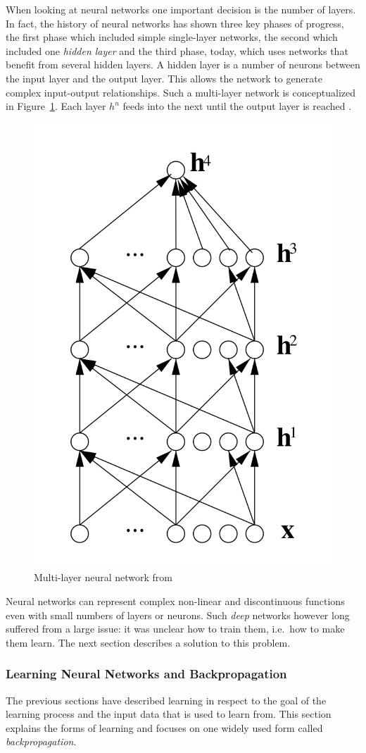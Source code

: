 When looking at neural networks one important decision is the number of layers. In fact, the history of neural networks has shown
three key phases of progress, the first phase which included simple single-layer networks, the second which included one
\emph{hidden layer} and the third phase, today, which uses networks that benefit from several hidden layers. A hidden
layer is a number of neurons between the input layer and the output layer. This allows the network to generate complex
input-output relationships. Such a multi-layer network is conceptualized in Figure~\ref{fig:multilayernn}. Each layer
$h^n$ feeds into the next until the output layer is reached \citep[p.729ff.]{russell2016artificial}.

\begin{figure}[]
    \centering
    \includegraphics[width=0.3\linewidth]{img/multilayer_nn.png}
    \caption{Multi-layer neural network from \citep{bengio2009learning} }
    \label{fig:multilayernn}
\end{figure}

Neural networks can represent complex non-linear and discontinuous functions
\cite[p.732]{russell2016artificial} even with small numbers of layers or neurons. Such \emph{deep} networks however long
suffered from a large issue: it was unclear how to train them, i.e.\ how to make them learn. The next section describes
a solution to this problem.

\subsubsection{Learning Neural Networks and Backpropagation}
\label{sec:Backpropagation}




The previous sections have described learning in respect to the goal of the learning process and the input data that is
used to learn from. This section explains the forms of learning and focuses on one widely used form called \emph{backpropagation}.

